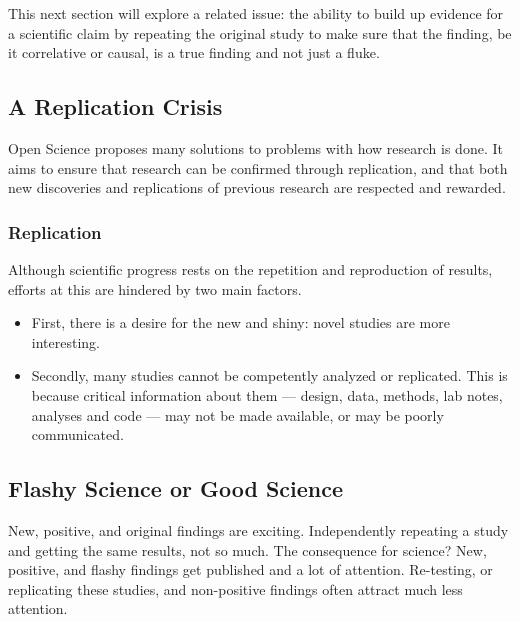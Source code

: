 \documentclass[
]{book}
\providecommand{\tightlist}{%
  \setlength{\itemsep}{0pt}\setlength{\parskip}{0pt}}
\begin{document}
This next section will explore a related issue: the ability to build up evidence for a scientific claim by repeating the original study to make sure that the finding, be it correlative or causal, is a true finding and not just a fluke.

\hypertarget{a-replication-crisis}{%
\subsection*{A Replication Crisis}\label{a-replication-crisis}}

Open Science proposes many solutions to problems with how research is done. It aims to ensure that research can be confirmed through replication, and that both new discoveries and replications of previous research are respected and rewarded.

\hypertarget{replication}{%
\subsubsection*{Replication}\label{replication}}

Although scientific progress rests on the repetition and reproduction of results, efforts at this are hindered by two main factors.

\begin{itemize}
\tightlist
\item
  First, there is a desire for the new and shiny: novel studies are more interesting.
\item
  Secondly, many studies cannot be competently analyzed or replicated. This is because critical information about them --- design, data, methods, lab notes, analyses and code --- may not be made available, or may be poorly communicated.
\end{itemize}

\hypertarget{flashy-science-or-good-science}{%
\subsection*{Flashy Science or Good Science}\label{flashy-science-or-good-science}}

New, positive, and original findings are exciting. Independently repeating a study and getting the same results, not so much. The consequence for science? New, positive, and flashy findings get published and a lot of attention. Re-testing, or replicating these studies, and non-positive findings often attract much less attention.
\end{document}
